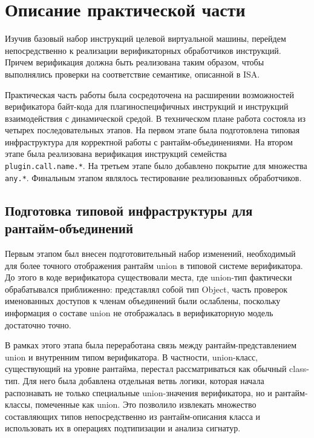 \section{Описание практической части}
\label{sec:Chapter4} 
Изучив базовый набор инструкций целевой виртуальной машины, перейдем непосредственно к реализации
верификаторных обработчиков инструкций. Причем верификация должна быть реализована
таким образом, чтобы выполнялись проверки на соответствие семантике, описанной в ISA.

Практическая часть работы была
сосредоточена на расширении возможностей верификатора байт-кода для плагиноспецифичных инструкций и
инструкций взаимодействия с динамической средой. В техническом плане работа состояла из четырех
последовательных этапов. На первом этапе была подготовлена типовая инфраструктура для корректной
работы с рантайм-объединениями. На втором этапе была реализована верификация инструкций семейства
\texttt{plugin.call.name.*}. На третьем этапе было добавлено покрытие для множества \texttt{any.*}.
Финальным этапом являлось тестирование реализованных обработчиков.

\subsection{Подготовка типовой инфраструктуры для рантайм-объединений}

Первым этапом был внесен подготовительный набор изменений, необходимый для более точного отображения
рантайм union в типовой системе верификатора. До этого в коде верификатора существовали места, где
union-тип фактически обрабатывался приближенно: представлял собой тип Object, часть проверок
именованных доступов к членам
объединений были ослаблены, поскольку информация о составе union не отображалась в
верификаторную модель достаточно точно.

В рамках этого этапа была переработана связь между \newline рантайм-представлением union и внутренним типом
верификатора. В частности, union-класс, существующий на уровне рантайма, перестал
рассматриваться как обычный class-тип. Для него была добавлена отдельная ветвь логики, которая
начала распознавать не только специальные union-значения верификатора, но и
рантайм-классы, помеченные как union. Это позволило извлекать множество составляющих типов
непосредственно из рантайм-описания класса и использовать их в операциях подтипизации и анализа
сигнатур.

